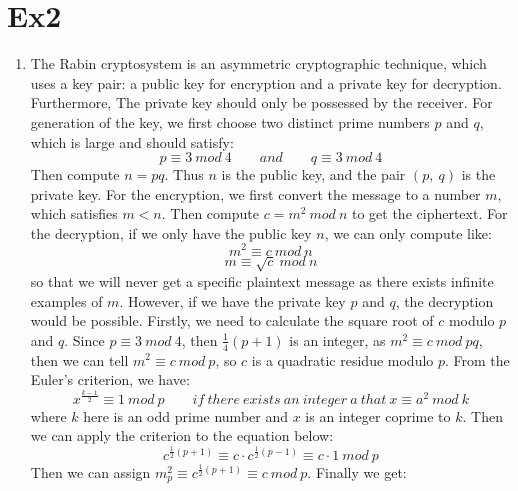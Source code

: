 \documentclass[12pt, a4paper]{article}
\begin{document}
\newpage

\section{Ex2}
\begin{enumerate}
    \item The Rabin cryptosystem is an asymmetric cryptographic technique, which uses a key pair:
          a public key for encryption and a private key for decryption. Furthermore, 
          The private key should only be possessed by the receiver.\newline
          For generation of the key, we first choose two distinct prime numbers $p$ and $q$, 
          which is large and should satisfy:\\
          $$p \equiv 3\ mod\ 4 \qquad and \qquad q \equiv 3\ mod\ 4$$
          Then compute $n = pq$.\newline
          Thus $n$ is the public key, and the pair $(p,\ q)$ is the private key.\newline
          For the encryption, we first convert the message to a number $m$, which satisfies
          $m < n$. Then compute $c = m^2\ mod\ n$ to get the ciphertext.\newline
          For the decryption, if we only have the public key $n$, we can only compute like:\\
          $$m^2 \equiv c\ mod\ n$$
          $$m \equiv \sqrt{c}\ mod\ n$$
          so that we will never get a specific plaintext message as there exists infinite examples of $m$.\newline
          However, if we have the private key $p$ and $q$, the decryption would be possible.
          Firstly, we need to calculate the square root of $c$ modulo $p$ and $q$.\newline
          Since $p \equiv 3\ mod\ 4$, then $\frac{1}{4}(p+1)$ is an integer, 
          as $m^2 \equiv c\ mod\ pq$, then we can tell $m^2 \equiv c\ mod\ p$, so $c$ is a quadratic residue modulo $p$.
          From the Euler's criterion, we have:\newline
          $$x^{\frac{k-1}{2}} \equiv 1\ mod\ p \qquad if\ there\ exists\ an\ integer\ a\ that\ x \equiv a^2\ mod\ k$$
          where $k$ here is an odd prime number and $x$ is an integer coprime to $k$.
          Then we can apply the criterion to the equation below:\newline
          $$c^{\frac{1}{2}(p+1)} \equiv c\cdot c^{\frac{1}{2}(p-1)} \equiv c\cdot 1\ mod\ p$$
          Then we can assign $m_p^2 \equiv c^{\frac{1}{2}(p+1)} \equiv c\ mod\ p$. Finally we get:\newline

\end{enumerate}
\end{document}
